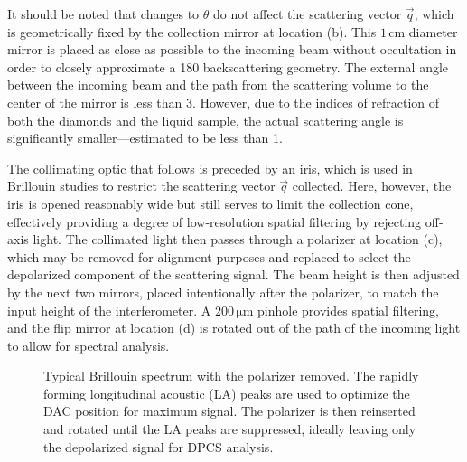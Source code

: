 It should be noted that changes to $\theta$ do not affect the scattering vector $\vec{q}$, which is geometrically fixed by the collection mirror at location (b). This $1 \,\si{\centi\meter}$ diameter mirror is placed as close as possible to the incoming beam without occultation in order to closely approximate a 180\textdegree{} backscattering geometry. The external angle between the incoming beam and the path from the scattering volume to the center of the mirror is less than 3\textdegree. However, due to the indices of refraction of both the diamonds and the liquid sample, the actual scattering angle is significantly smaller—estimated to be less than 1\textdegree.  

The collimating optic that follows is preceded by an iris, which is used in Brillouin studies to restrict the scattering vector $\vec{q}$ collected. Here, however, the iris is opened reasonably wide but still serves to limit the collection cone, effectively providing a degree of low-resolution spatial filtering by rejecting off-axis light. The collimated light then passes through a polarizer at location (c), which may be removed for alignment purposes and replaced to select the depolarized component of the scattering signal. The beam height is then adjusted by the next two mirrors, placed intentionally after the polarizer, to match the input height of the interferometer. A $200 \,\si{\micro\meter}$ pinhole provides spatial filtering, and the flip mirror at location (d) is rotated out of the path of the incoming light to allow for spectral analysis.

\begin{figure}[!htbp]
	\centering
	\caption{Typical Brillouin spectrum with the polarizer removed. The rapidly forming longitudinal acoustic (LA) peaks are used to optimize the DAC position for maximum signal. The polarizer is then reinserted and rotated until the LA peaks are suppressed, ideally leaving only the depolarized signal for DPCS analysis.}
	\label{figure:LAmodes}
\end{figure}

